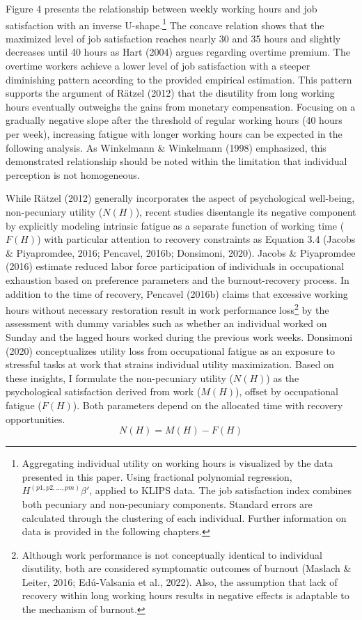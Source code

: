\documentclass[
  12pt,
]{article}
\begin{document}
Figure 4 presents the relationship between weekly working hours and job
satisfaction with an inverse U-shape.\footnote{Aggregating individual
  utility on working hours is visualized by the data presented in this
  paper. Using fractional polynomial regression,
  \(H^{(p1, p2, ..., pm)} \beta'\), applied to KLIPS data. The job
  satisfaction index combines both pecuniary and non-pecuniary
  components. Standard errors are calculated through the clustering of
  each individual. Further information on data is provided in the
  following chapters.} The concave relation shows that the maximized
level of job satisfaction reaches nearly 30 and 35 hours and slightly
decreases until 40 hours as Hart (2004) argues regarding overtime
premium. The overtime workers achieve a lower level of job satisfaction
with a steeper diminishing pattern according to the provided empirical
estimation. This pattern supports the argument of Rätzel (2012) that the
disutility from long working hours eventually outweighs the gains from
monetary compensation. Focusing on a gradually negative slope after the
threshold of regular working hours (40 hours per week), increasing
fatigue with longer working hours can be expected in the following
analysis. As Winkelmann \& Winkelmann (1998) emphasized, this
demonstrated relationship should be noted within the limitation that
individual perception is not homogeneous.

While Rätzel (2012) generally incorporates the aspect of psychological
well-being, non-pecuniary utility (\(N(H)\)), recent studies disentangle
its negative component by explicitly modeling intrinsic fatigue as a
separate function of working time (\(F(H)\)) with particular attention
to recovery constraints as Equation 3.4 (Jacobs \& Piyapromdee, 2016;
Pencavel, 2016b; Donsimoni, 2020). Jacobs \& Piyapromdee (2016) estimate
reduced labor force participation of individuals in occupational
exhaustion based on preference parameters and the burnout-recovery
process. In addition to the time of recovery, Pencavel (2016b) claims
that excessive working hours without necessary restoration result in
work performance loss\footnote{Although work performance is not
  conceptually identical to individual disutility, both are considered
  symptomatic outcomes of burnout (Maslach \& Leiter, 2016; Edú-Valsania
  et al., 2022). Also, the assumption that lack of recovery within long
  working hours results in negative effects is adaptable to the
  mechanism of burnout.} by the assessment with dummy variables such as
whether an individual worked on Sunday and the lagged hours worked
during the previous work weeks. Donsimoni (2020) conceptualizes utility
loss from occupational fatigue as an exposure to stressful tasks at work
that strains individual utility maximization. Based on these insights, I
formulate the non-pecuniary utility (\(N(H)\)) as the psychological
satisfaction derived from work (\(M(H)\)), offset by occupational
fatigue (\(F(H)\)). Both parameters depend on the allocated time with
recovery opportunities. \[
N(H) = M(H) - F(H)
\tag{3.4}
\]
\end{document}

